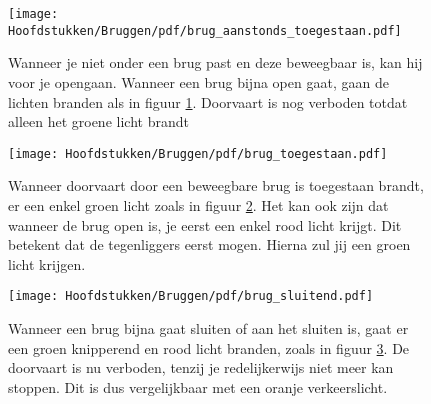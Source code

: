 \vspace{-0.75cm}
\begin{figure}[H]
	\centering
	\begin{minipage}[b]{0.18\textwidth}
		\texttt{[image: Hoofdstukken/Bruggen/pdf/brug\_aanstonds\_toegestaan.pdf]}
		\caption{}
		\label{pic:brug:aanstonds}
	\end{minipage}
	\hfill
	\begin{minipage}[t]{0.75\textwidth}
		\vspace{-2.5cm}
		Wanneer je niet onder een brug past en deze beweegbaar is, kan hij voor je opengaan. Wanneer een brug bijna open gaat, gaan de lichten branden als in figuur \ref{pic:brug:aanstonds}. Doorvaart is nog verboden totdat alleen het groene licht brandt
	\end{minipage}
\end{figure}
\vspace{-0.75cm}
\begin{figure}[H]
	\centering
	\begin{minipage}[b]{0.18\textwidth}
		\texttt{[image: Hoofdstukken/Bruggen/pdf/brug\_toegestaan.pdf]}
		\caption{}
		\label{pic:brug:vrij}
	\end{minipage}
	\hfill
	\begin{minipage}[t]{0.75\textwidth}
		\vspace{-2.5cm}
		Wanneer doorvaart door een beweegbare brug is toegestaan brandt, er een enkel groen licht zoals in figuur \ref{pic:brug:vrij}. Het kan ook zijn dat wanneer de brug open is, je eerst een enkel rood licht krijgt. Dit betekent dat de tegenliggers eerst mogen. Hierna zul jij een groen licht krijgen.
	\end{minipage}
\end{figure}
\vspace{-0.75cm}
\begin{figure}[H]
	\centering
	\begin{minipage}[b]{0.18\textwidth}
		\texttt{[image: Hoofdstukken/Bruggen/pdf/brug\_sluitend.pdf]}
		\caption{}
		\label{pic:brug:sluitend}
	\end{minipage}
	\hfill
	\begin{minipage}[t]{0.75\textwidth}
		\vspace{-2.5cm}
		Wanneer een brug bijna gaat sluiten of aan het sluiten is, gaat er een groen knipperend en rood licht branden, zoals in figuur \ref{pic:brug:sluitend}. De doorvaart is nu verboden, tenzij je redelijkerwijs niet meer kan stoppen. Dit is dus vergelijkbaar met een oranje verkeerslicht. 
	\end{minipage}
\end{figure}
